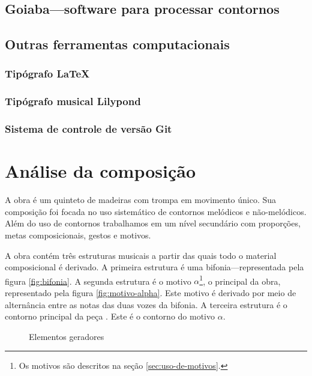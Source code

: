 \section{Goiaba---software para processar contornos}
\label{sec:goiaba-software-para}

\section{Outras ferramentas computacionais}
\label{sec:outr-ferr-comp}

\subsection{Tipógrafo \LaTeX{}}
\label{sec:latex}

\subsection{Tipógrafo musical Lilypond}
\label{sec:tipogr-music-lilyp}

\subsection{Sistema de controle de versão Git}
\label{sec:sistema-de-controle}

\chapter{Análise da composição}
\label{cha:anal-da-comp}

A obra \obra{} é um quinteto de madeiras com trompa em movimento
único. Sua composição foi focada no uso sistemático de contornos
melódicos e não-melódicos. Além do uso de contornos trabalhamos em um
nível secundário com proporções, metas composicionais, gestos e
motivos.

A obra contém três estruturas musicais a partir das quais todo o
material composicional é derivado. A primeira estrutura é uma
bifonia---representada pela figura \ref{fig:bifonia}. A segunda
estrutura é o motivo $\alpha$\footnote{Os motivos são descritos na
  seção \ref{sec:uso-de-motivos}.}, o principal da obra, representado
pela figura \ref{fig:motivo-alpha}. Este motivo é derivado por meio de
alternância entre as notas das duas vozes da bifonia. A terceira
estrutura é o contorno principal da peça \contpr{}. Este é o contorno
do motivo $\alpha$.

\begin{figure}
  \centering

  \caption{Elementos geradores}
  \label{fig:elementos-geradores}
\end{figure}

